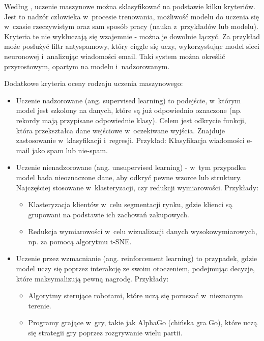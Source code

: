 Według \cite{Geron2020}, uczenie maszynowe można sklasyfikować na podstawie kilku kryteriów.
Jest to nadzór człowieka w~procesie trenowania, możliwość modelu do uczenia się w~czasie rzeczywistym
oraz sam sposób pracy (nauka z~przykładów lub modelu). Kryteria te nie wykluczają się wzajemnie - można je dowolnie łączyć.
Za przykład może posłużyć filtr antyspamowy, który ciągle się uczy,
wykorzystując model sieci neuronowej i~analizując wiadomości email.
Taki system można określić przyrostowym, opartym na modelu i~nadzorowanym.

Dodatkowe kryteria oceny rodzaju uczenia maszynowego:
\begin{itemize}[label=-,labelsep=0.4cm,leftmargin=0.6cm]
    \item Uczenie nadzorowane (ang. supervised learning) to podejście, w~którym model jest szkolony na danych,
        które są już odpowiednio oznaczone (np. rekordy mają przypisane odpowiednie klasy).
        Celem jest odkrycie funkcji, która przekształca dane wejściowe w~oczekiwane wyjścia.
        Znajduje zastosowanie w~klasyfikacji i~regresji.
        Przykład: Klasyfikacja wiadomości e-mail jako spam lub nie-spam.
    \item Uczenie nienadzorowane (ang. unsupervised learning)
        - w~tym przypadku model bada nieoznaczone dane, aby odkryć pewne wzorce lub struktury.
        Najczęściej stosowane w~klasteryzacji, czy redukcji wymiarowości. Przykłady:
        \begin{itemize}[label=*,labelsep=0.4cm,leftmargin=0.8cm]
            \item Klasteryzacja klientów w~celu segmentacji rynku, gdzie klienci są grupowani na podstawie ich zachowań zakupowych. 
            \item Redukcja wymiarowości w~celu wizualizacji danych wysokowymiarowych, np. za pomocą algorytmu t-SNE.
        \end{itemize}
    \item Uczenie przez wzmacnianie (ang. reinforcement learning) to przypadek,
        gdzie model uczy się poprzez interakcję ze swoim otoczeniem,
        podejmując decyzje, które maksymalizują pewną nagrodę. Przykłady:
        \begin{itemize}[label=*,labelsep=0.4cm,leftmargin=0.8cm]
            \item Algorytmy sterujące robotami, które uczą się poruszać w~nieznanym terenie. 
            \item Programy grające w~gry, takie jak AlphaGo (chińska gra Go), które uczą się strategii gry poprzez rozgrywanie wielu partii.
        \end{itemize}
\end{itemize}